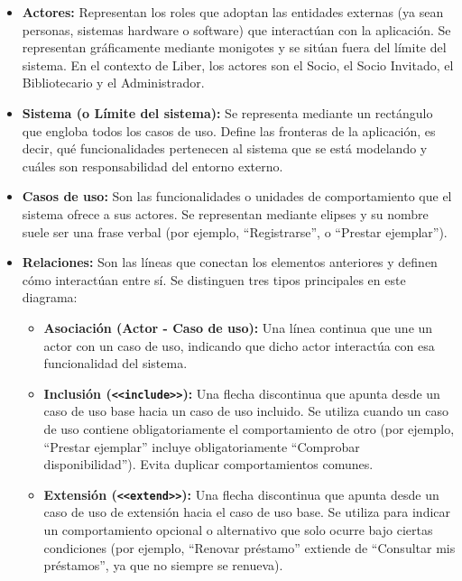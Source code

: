 \begin{itemize}
	\item \textbf{Actores:} Representan los roles que adoptan las entidades externas (ya sean personas, sistemas hardware o software) que interactúan con la aplicación. Se representan gráficamente mediante monigotes y se sitúan fuera del límite del sistema. En el contexto de Liber, los actores son el Socio, el Socio Invitado, el Bibliotecario y el Administrador.
	
	\item \textbf{Sistema (o Límite del sistema):} Se representa mediante un rectángulo que engloba todos los casos de uso. Define las fronteras de la aplicación, es decir, qué funcionalidades pertenecen al sistema que se está modelando y cuáles son responsabilidad del entorno externo.
	
	\item \textbf{Casos de uso:} Son las funcionalidades o unidades de comportamiento que el sistema ofrece a sus actores. Se representan mediante elipses y su nombre suele ser una frase verbal (por ejemplo, ``Registrarse'', o ``Prestar ejemplar'').
	
	\item \textbf{Relaciones:} Son las líneas que conectan los elementos anteriores y definen cómo interactúan entre sí. Se distinguen tres tipos principales en este diagrama:
	\begin{itemize}
		\item \textbf{Asociación (Actor - Caso de uso):} Una línea continua que une un actor con un caso de uso, indicando que dicho actor interactúa con esa funcionalidad del sistema.
		\item \textbf{Inclusión (\texttt{<<include>>}):} Una flecha discontinua que apunta desde un caso de uso base hacia un caso de uso incluido. Se utiliza cuando un caso de uso contiene obligatoriamente el comportamiento de otro (por ejemplo, ``Prestar ejemplar'' incluye obligatoriamente ``Comprobar disponibilidad''). Evita duplicar comportamientos comunes.
		\item \textbf{Extensión (\texttt{<<extend>>}):} Una flecha discontinua que apunta desde un caso de uso de extensión hacia el caso de uso base. Se utiliza para indicar un comportamiento opcional o alternativo que solo ocurre bajo ciertas condiciones (por ejemplo, ``Renovar préstamo'' extiende de ``Consultar mis préstamos'', ya que no siempre se renueva).
	\end{itemize}
\end{itemize}
